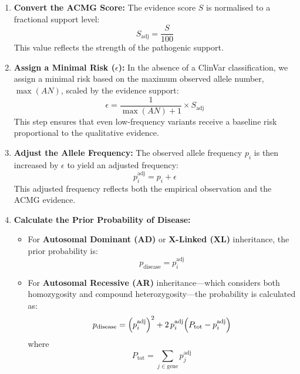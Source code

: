 \begin{enumerate}
    \item \textbf{Convert the ACMG Score:}  
    The evidence score \(S\) is normalised to a fractional support level:
    \[
    S_{\text{adj}} = \frac{S}{100}
    \]
    This value reflects the strength of the pathogenic support.
    
    \item \textbf{Assign a Minimal Risk (\(\epsilon\)):}  
    In the absence of a ClinVar classification, we assign a minimal risk based on the maximum observed allele number, \(\max(AN)\), scaled by the evidence support:
    \[
    \epsilon = \frac{1}{\max(AN) + 1} \times S_{\text{adj}}
    \]
    This step ensures that even low-frequency variants receive a baseline risk proportional to the qualitative evidence.
    
    \item \textbf{Adjust the Allele Frequency:}  
    The observed allele frequency \(p_i\) is then increased by \(\epsilon\) to yield an adjusted frequency:
    \[
    p_i^{\text{adj}} = p_i + \epsilon
    \]
    This adjusted frequency reflects both the empirical observation and the ACMG evidence.
    
    \item \textbf{Calculate the Prior Probability of Disease:}  
    \begin{itemize}
        \item For \textbf{Autosomal Dominant (AD)} or \textbf{X-Linked (XL)} inheritance, the prior probability is:
        \[
        p_{\text{disease}} = p_i^{\text{adj}}
        \]
        \item For \textbf{Autosomal Recessive (AR)} inheritance—which considers both homozygosity and compound heterozygosity—the probability is calculated as:
        \[
        p_{\text{disease}} = \left(p_i^{\text{adj}}\right)^2 + 2\,p_i^{\text{adj}}\Bigl(P_{\text{tot}} - p_i^{\text{adj}}\Bigr)
        \]
        where
        \[
        P_{\text{tot}} = \sum_{j \in \text{gene}} p_j^{\text{adj}}
        \]
    \end{itemize}
\end{enumerate}
